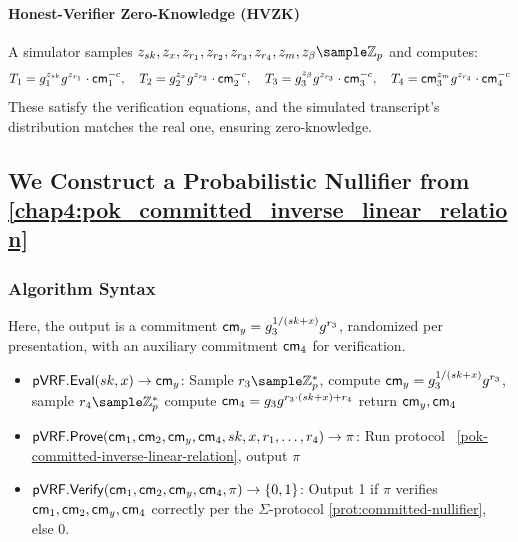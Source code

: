 \paragraph{Honest-Verifier Zero-Knowledge (HVZK)}
A simulator samples $z_{sk}, z_x, z_{r_1}, z_{r_2}, z_{r_3}, z_{r_4}, z_m, z_{\beta} \sample \mathbb{Z}_p$ and computes:
\[
T_1 = g_1^{z_{sk}} g^{z_{r_1}} \cdot \mathsf{cm}_1^{-c}, \quad T_2 = g_2^{z_x} g^{z_{r_2}} \cdot \mathsf{cm}_2^{-c}, \quad T_3 = g_3^{z_{\beta}} g^{z_{r_3}} \cdot \mathsf{cm}_3^{-c}, \quad T_4 = \mathsf{cm}_3^{z_m} g^{z_{r_4}} \cdot \mathsf{cm}_4^{-c}
\]
These satisfy the verification equations, and the simulated transcript’s distribution matches the real one, ensuring zero-knowledge.






































\subsection{We Construct a Probabilistic Nullifier from \ref{chap4:pok_committed_inverse_linear_relation}}\label{sec-probabilistic-nullifier}

\subsubsection{Algorithm Syntax}
Here, the output is a commitment $\mathsf{cm}_y = g_3^{1/(sk + x)} g^{r_3}$, randomized per presentation, with an auxiliary commitment $\mathsf{cm}_4$ for verification.

\begin{itemize}
    \item $\mathsf{pVRF.Eval}(sk, x) \to \mathsf{cm}_y$: Sample $r_3 \sample \Z_p^*$, compute $\mathsf{cm}_y = g_3^{1/(sk+x)}g^{r_3}$, sample $r_4 \sample \Z_p^*$ compute $\mathsf{cm}_4 = g_3g^{r_3 \cdot (sk+x) + r_4}$ return $\mathsf{cm}_y, \mathsf{cm}_4$
    
    \item $\mathsf{pVRF.Prove}(\mathsf{cm}_1, \mathsf{cm}_2, \mathsf{cm}_y, \mathsf{cm}_4, sk, x, r_1, \ldots, r_4) \to \pi$: Run protocol ~\ref{pok-committed-inverse-linear-relation}, output $\pi$
    
    \item $\mathsf{pVRF.Verify}(\mathsf{cm}_1, \mathsf{cm}_2, \mathsf{cm}_y, \mathsf{cm}_4, \pi) \to \{0,1\}$: Output 1 if $\pi$ verifies $\mathsf{cm}_1, \mathsf{cm}_2, \mathsf{cm}_y, \mathsf{cm}_4$ correctly per the $\Sigma$-protocol \ref{prot:committed-nullifier}, else 0.
\end{itemize}




